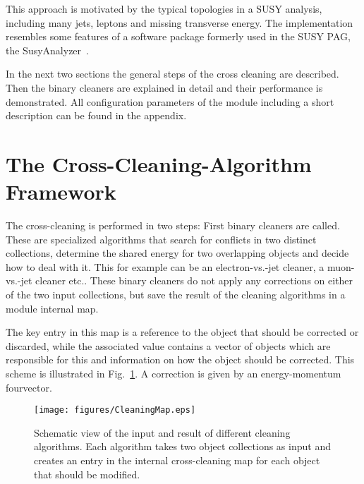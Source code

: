 \documentclass{cmspaper}
\begin{document}
This approach is motivated by the typical topologies in a SUSY analysis,
including many jets, leptons and missing transverse energy. The implementation
resembles some features of a software package formerly used in the SUSY PAG,
the SusyAnalyzer~\cite{wikiSusyAnalyzer}.

In the next two sections the general steps of the cross cleaning are described.
Then the binary cleaners are explained in detail and their performance is
demonstrated. All configuration parameters of the module including a short
description can be found in the appendix.


\section{The Cross-Cleaning-Algorithm Framework}
The cross-cleaning is performed in two steps: First binary cleaners are called.
These are specialized algorithms that search for conflicts in two distinct
collections, determine the shared energy for two overlapping objects and decide
how to deal with it. This for example can be an electron-vs.-jet cleaner, a
muon-vs.-jet cleaner etc.. These binary cleaners do not apply any corrections
on either of the two input collections, but save the result of the cleaning
algorithms in a module internal map.

The key entry in this map is a reference to the object that should be corrected
or discarded, while the associated value contains a vector of objects which are
responsible for this and information on how the object should be corrected. This
scheme is illustrated in Fig.~\ref{fig:Cleaning}. A correction is given by an
energy-momentum fourvector.

\begin{figure}[hbt]
\begin{center}
\texttt{[image: figures/CleaningMap.eps]}
\caption{Schematic view of the input and result of different cleaning
    algorithms. Each algorithm takes two object collections as input and
    creates an entry in the internal cross-cleaning map for each object
    that should be modified.}
\label{fig:Cleaning}
\end{center}
\end{figure}
\end{document}
